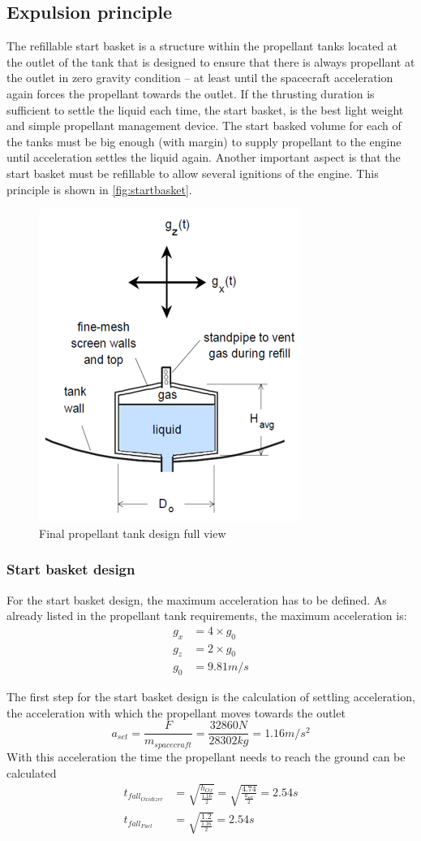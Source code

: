\subsection{Expulsion principle}
The refillable start basket is a structure within the propellant tanks located at the outlet of the tank that is designed to ensure that there is always propellant at the outlet in zero gravity condition – at least until the spacecraft acceleration again forces the propellant towards the outlet. If the thrusting duration is sufficient to settle the liquid each time, the start basket, is the best light weight and simple propellant management device. The start basked volume for each of the tanks must be big enough (with margin) to supply propellant to the engine until acceleration settles the liquid again. Another important aspect is that the start basket must be refillable to allow several ignitions of the engine. This principle is shown in \autoref{fig:startbasket}.
\begin{figure}[H]
	\centering
	\includegraphics[width=0.3\linewidth]{startbasket}
	\caption{Final propellant tank design full view}\label{fig:startbasket}
\end{figure}
\subsubsection{Start basket design}
For the start basket design, the maximum acceleration has to be defined. As already listed in the propellant tank requirements, the maximum acceleration is:
\begin{align}
    g_x &= 4\times g_0\\
    g_z &= 2\times g_0\\
    g_0 &= 9.81 m/s
\end{align}{}

The first step for the start basket design is the calculation of settling acceleration, the acceleration with which the propellant moves towards the outlet
\begin{equation}
    a_{set} = \frac{F}{m_{spacecraft}} = \frac{32860N}{28302kg} = 1.16m/s^2
\end{equation}{}
With this acceleration the time the propellant needs to reach the ground can be calculated
\begin{align}
    t_{fall_{Oxidizer}} &= \sqrt{\frac{h_{Ox}}{\frac{1.16}{2}}} = \sqrt{\frac{4.74}{\frac{a_{set}}{2}}} =2.54s\\
    t_{fall_{Fuel}} &= \sqrt{\frac{1.2}{\frac{1.16}{2}}} = 2.54s
\end{align}{}

